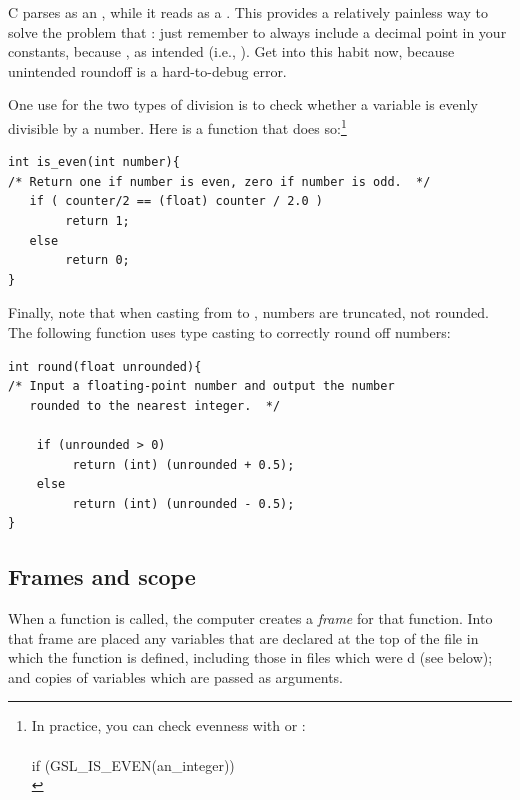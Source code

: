 \documentclass[12pt]{article}
\begin{document}
C parses  as an , while it reads 
as a . This provides a relatively painless way to solve
the problem that : just remember to always include
a decimal point in your constants, because ,
as intended (i.e., ). Get into this
habit now, because unintended roundoff is a hard-to-debug error.

One use for the two types of division is to check whether a variable is evenly divisible by a number. Here
is a function that does so:\footnote{In practice, you can check evenness
with  or :\\ 
\\
if (GSL\_IS\_EVEN(an\_integer))\\
\phantom{hello.}
}

\begin{lstlisting}
int is_even(int number){
/* Return one if number is even, zero if number is odd.  */
   if ( counter/2 == (float) counter / 2.0 )
        return 1;
   else 
        return 0;
}
\end{lstlisting}

Finally, note that when casting from  to , numbers
are truncated, not rounded.  The following function uses type casting
to correctly round off numbers:

\begin{lstlisting}
int round(float unrounded){
/* Input a floating-point number and output the number
   rounded to the nearest integer.  */

    if (unrounded > 0)
         return (int) (unrounded + 0.5);
    else
         return (int) (unrounded - 0.5);
}
\end{lstlisting}



\subsection{Frames and scope}  
When a function is called, the computer creates a
{\sl frame} for that function. Into that frame are placed any variables
that are declared at the top of the file in which the function is defined,
including those in files which were d (see below); and copies of
variables which are passed as arguments. 
\end{document}
